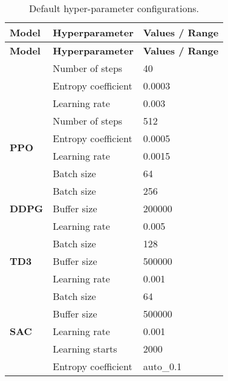 \begin{longtable}{|l|l|p{8cm}|}
    \caption{Default hyper-parameter configurations.}
    \label{tab:default_hyperparameters}
    \\ 
    \hline
    \textbf{Model} & \textbf{Hyperparameter} & \textbf{Values / Range} \\ \midrule
    \endfirsthead

    \hline
    \textbf{Model} & \textbf{Hyperparameter} & \textbf{Values / Range} \\ \midrule
    \endhead

    \endfoot

    \multirow{3}{*}{\textbf{A2C}}
    & Number of steps & 40 \\
    & Entropy coefficient & 0.0003 \\ 
    & Learning rate & 0.003 \\ \hline


    \multirow{4}{*}{\textbf{PPO}}
    & Number of steps & 512 \\ 
    & Entropy coefficient & 0.0005 \\ 
    & Learning rate & 0.0015 \\ 
    & Batch size & 64 \\ \hline

    \multirow{3}{*}{\textbf{DDPG}}
    & Batch size & 256 \\ 
    & Buffer size & 200000 \\ 
    & Learning rate & 0.005 \\ \hline

    \multirow{3}{*}{\textbf{TD3}}
    & Batch size & 128 \\ 
    & Buffer size & 500000 \\ 
    & Learning rate & 0.001 \\ \hline

    \multirow{5}{*}{\textbf{SAC}}
    & Batch size & 64 \\ 
    & Buffer size & 500000 \\ 
    & Learning rate & 0.001 \\ 
    & Learning starts & 2000 \\ 
    & Entropy coefficient & auto\_0.1 \\ \hline
\end{longtable}